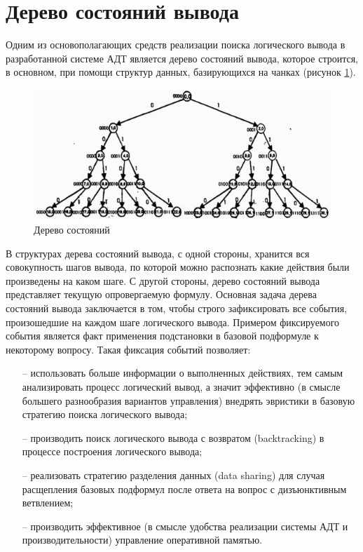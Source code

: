 \section{Дерево состояний вывода}
Одним из основополагающих средств реализации поиска логического вывода в разработанной системе АДТ является дерево состояний вывода, которое строится, в основном, при помощи структур данных, базирующихся на чанках (рисунок \ref{dk6}).

        \begin{figure}[h]
				\centering
				\includegraphics[width=150mm]{src/pictures/pic6.jpg}
				\caption{Дерево состояний}\label{dk6}
        \end{figure}
        
В структурах дерева состояний вывода, с одной стороны, хранится вся совокупность шагов вывода, по которой можно распознать какие действия были произведены на каком шаге. С другой стороны, дерево состояний вывода представляет текущую опровергаемую формулу. Основная задача дерева состояний вывода заключается в том, чтобы строго зафиксировать все события, произошедшие на каждом шаге логического вывода. Примером фиксируемого события является факт применения подстановки в базовой подформуле к некоторому вопросу. Такая фиксация событий позволяет:

    \begin{itemize}
				\item[--] использовать больше информации о выполненных действиях, тем самым анализировать процесс логический вывод, а значит эффективно (в смысле большего разнообразия вариантов управления) внедрять эвристики в базовую стратегию поиска логического вывода;
				\item[--] производить поиск логического вывода с возвратом (backtracking) в процессе построения логического вывода;
				\item[--] реализовать стратегию разделения данных (data sharing) для случая расщепления базовых подформул после ответа на вопрос с дизъюнктивным ветвлением;
				\item[--] производить эффективное (в смысле удобства реализации системы АДТ и производительности) управление оперативной памятью.
    \end{itemize}
    
